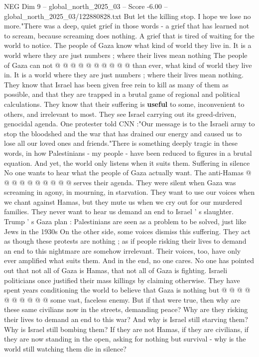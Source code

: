 \begin{textsample}{NEG Dim 9 – global\_north\_2025\_03 – Score -6.00 – global\_north\_2025\_03/122880828.txt}
But let the killing stop.
I hope we lose no more."There was a deep, quiet grief in those words - a grief that has learned not to scream, because screaming does nothing.
A grief that is tired of waiting for the world to notice.
The people of Gaza know what kind of world they live in.
It is a world where they are just numbers ; where their lives mean nothing The people of Gaza can not @ @ @ @ @ @ @ @ @ @ than ever, what kind of world they live in.
It is a world where they are just numbers ; where their lives mean nothing.
They know that Israel has been given free rein to kill as many of them as possible, and that they are trapped in a brutal game of regional and political calculations.
They know that their suffering is \textbf{useful} to some, inconvenient to others, and irrelevant to most.
They see Israel carrying out its greed-driven, genocidal agenda.
One protester told CNN :"Our message is to the Israeli army to stop the bloodshed and the war that has drained our energy and caused us to lose all our loved ones and friends."There is something deeply tragic in these words, in how Palestinians - my people - have been reduced to figures in a brutal equation.
And yet, the world only listens when it suits them.
Suffering in silence No one wants to hear what the people of Gaza actually want.
The anti-Hamas @ @ @ @ @ @ @ @ @ @ serves their agenda.
They were silent when Gaza was screaming in agony, in mourning, in starvation.
They want to use our voices when we chant against Hamas, but they mute us when we cry out for our murdered families.
They never want to hear us demand an end to Israel ' s slaughter.
Trump ' s Gaza plan : Palestinians are seen as a problem to be solved, just like Jews in the 1930s On the other side, some voices dismiss this suffering.
They act as though these protests are nothing ; as if people risking their lives to demand an end to this nightmare are somehow irrelevant.
Their voices, too, have only ever amplified what suits them.
And in the end, no one cares.
No one has pointed out that not all of Gaza is Hamas, that not all of Gaza is fighting.
Israeli politicians once justified their mass killings by claiming otherwise.
They have spent years conditioning the world to believe that Gaza is nothing but @ @ @ @ @ @ @ @ @ @ some vast, faceless enemy.
But if that were true, then why are these same civilians now in the streets, demanding peace?
Why are they risking their lives to demand an end to this war?
And why is Israel still starving them?
Why is Israel still bombing them?
If they are not Hamas, if they are civilians, if they are now standing in the open, asking for nothing but survival - why is the world still watching them die in silence?

\end{textsample}

